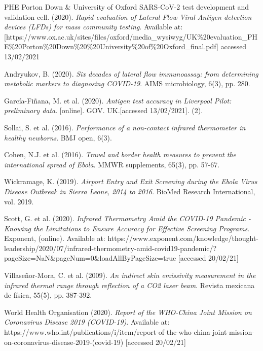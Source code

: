 \documentclass[11pt]{report}
\begin{document}
\begin{thebibliography}{1}
        PHE Porton Down \& University of Oxford SARS-CoV-2 test development and validation cell. (2020). \emph{Rapid evaluation of Lateral Flow Viral Antigen detection devices (LFDs) for mass community testing}.  Available at: [https://www.ox.ac.uk/sites/files/oxford/media\_wysiwyg/UK\%20evaluation\_PHE\%20Porton\%20Down\%20\%20University\%20of\%20Oxford\_final.pdf] accessed 13/02/2021

        Andryukov, B. (2020). \emph{Six decades of lateral flow immunoassay: from determining metabolic markers to diagnosing COVID-19}. AIMS microbiology, 6(3), pp. 280.

        García-Fiñana, M. et al. (2020). \emph{Antigen test accuracy in Liverpool Pilot: preliminary data}. [online]. GOV. UK.[accessed 13/02/2021]. (2).
        
        Sollai, S. et al. (2016). \emph{Performance of a non-contact infrared thermometer in healthy newborns}. BMJ open, 6(3).

        Cohen, N.J. et al. (2016). \emph{Travel and border health measures to prevent the international spread of Ebola}. MMWR supplements, 65(3), pp. 57-67.
        
        Wickramage, K. (2019). \emph{Airport Entry and Exit Screening during the Ebola Virus Disease Outbreak in Sierra Leone, 2014 to 2016}. BioMed Research International,  vol. 2019.
        
        Scott, G. et al. (2020). \emph{Infrared Thermometry Amid the COVID-19 Pandemic - Knowing the Limitations to Ensure Accuracy for Effective Screening Programs}. Exponent, (online). Available at: https://www.exponent.com/knowledge/thought-leadership/2020/07/infrared-thermometry-amid-covid19-pandemic/?pageSize=NaN\&pageNum=0\&loadAllByPageSize=true [accessed 20/02/21]

        Villaseñor-Mora, C. et al. (2009). \emph{An indirect skin emissivity measurement in the infrared thermal range through reflection of a CO2 laser beam}. Revista mexicana de física, 55(5), pp. 387-392.

        World Health Organisation (2020). \emph{Report of the WHO-China Joint Mission on Coronavirus Disease 2019 (COVID-19)}. Available at: https://www.who.int/publications/i/item/report-of-the-who-china-joint-mission-on-coronavirus-disease-2019-(covid-19) [accessed 20/02/21]


\end{thebibliography}
\end{document}
